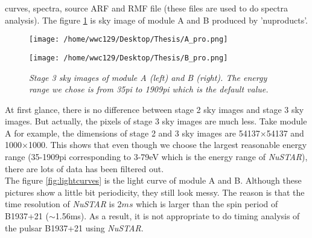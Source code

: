 \documentclass[12pt]{report}
\newcommand{\mycaption}[1]{\caption{\textit{\footnotesize #1}}}
\begin{document}
        curves, spectra, source ARF and RMF file (these files are used to do spectra analysis). The figure 
        \ref{fig:sky1} is sky image of module A and B produced by 'nuproducts'.\\
        \begin{figure}[h!]
          \begin{minipage}{0.45\textwidth}
            \begin{flushright}
                \texttt{[image: /home/wwc129/Desktop/Thesis/A\_pro.png]}
            \end{flushright}
          \end{minipage}
        \hspace{1.5cm}
          \begin{minipage}{0.45\textwidth}
            \begin{flushleft}
                \texttt{[image: /home/wwc129/Desktop/Thesis/B\_pro.png]}
            \end{flushleft}
          \end{minipage}
          \centering 
          \begin{minipage}[b]{0.85\textwidth}
            \vspace{0.25cm}
            \mycaption{Stage 3 sky images of module A (left) and B (right). The energy range we chose is from 
                        35pi to 1909pi which is the default value.}
            \label{fig:sky1}
          \end{minipage}
        \end{figure}
        \indent At first glance, there is no difference between stage 2 sky images and stage 3 sky images. 
        But actually, 
        the pixels of stage 3 sky images are much less. Take module A for example, the dimensions of stage 2 and 3
        sky images are 54137$\times$54137 and 1000$\times$1000. This shows that even though we choose the largest
        reasonable energy range (35-1909pi corresponding to 3-79eV which is the energy range of \textit{NuSTAR}), 
        there are lots of data has been filtered out.\\
        \indent
        The figure \ref{fig:lightcurves} is the light curve of module A and B. Although these pictures show a little 
        bit periodicity, they still look messy. The reason is that the time resolution of \textit{NuSTAR} is 2$ms$
        which is larger than the spin period of B1937+21 ($\sim$1.56ms). As a result, it is not appropriate to do 
        timing analysis of the pulsar B1937+21 using \textit{NuSTAR}. \\
\end{document}
